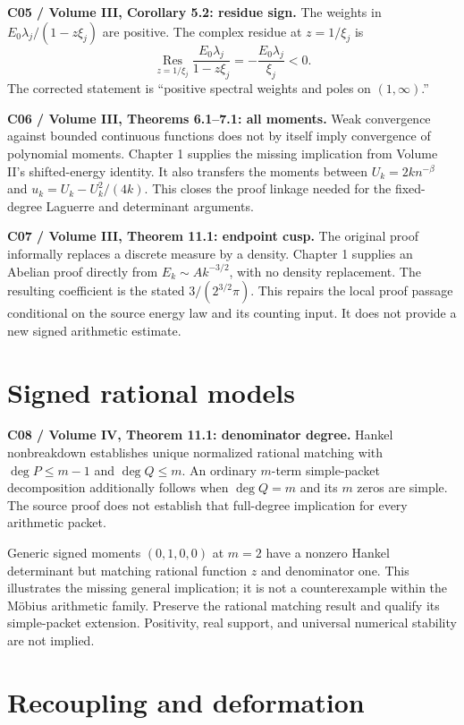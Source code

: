 \textbf{C05 / Volume III, Corollary 5.2: residue sign.}
The weights in $E_0\lambda_j/(1-z\xi_j)$ are positive. The complex residue at $z=1/\xi_j$ is
\[
\operatorname*{Res}_{z=1/\xi_j}
\frac{E_0\lambda_j}{1-z\xi_j}
=-\frac{E_0\lambda_j}{\xi_j}<0.
\]
The corrected statement is ``positive spectral weights and poles on $(1,\infty)$.''

\textbf{C06 / Volume III, Theorems 6.1--7.1: all moments.}
Weak convergence against bounded continuous functions does not by itself imply convergence of polynomial moments. Chapter 1 supplies the missing implication from Volume II's shifted-energy identity. It also transfers the moments between $U_k=2k n^{-\beta}$ and $u_k=U_k-U_k^2/(4k)$. This closes the proof linkage needed for the fixed-degree Laguerre and determinant arguments.

\textbf{C07 / Volume III, Theorem 11.1: endpoint cusp.}
The original proof informally replaces a discrete measure by a density. Chapter 1 supplies an Abelian proof directly from $E_k\sim A k^{-3/2}$, with no density replacement. The resulting coefficient is the stated $3/(2^{3/2}\pi)$. This repairs the local proof passage conditional on the source energy law and its counting input. It does not provide a new signed arithmetic estimate.

\section{Signed rational models}

\textbf{C08 / Volume IV, Theorem 11.1: denominator degree.}
Hankel nonbreakdown establishes unique normalized rational matching with $\deg P\le m-1$ and $\deg Q\le m$. An ordinary $m$-term simple-packet decomposition additionally follows when $\deg Q=m$ and its $m$ zeros are simple. The source proof does not establish that full-degree implication for every arithmetic packet.

Generic signed moments $(0,1,0,0)$ at $m=2$ have a nonzero Hankel determinant but matching rational function $z$ and denominator one. This illustrates the missing general implication; it is not a counterexample within the M\"obius arithmetic family. Preserve the rational matching result and qualify its simple-packet extension. Positivity, real support, and universal numerical stability are not implied.

\section{Recoupling and deformation}

